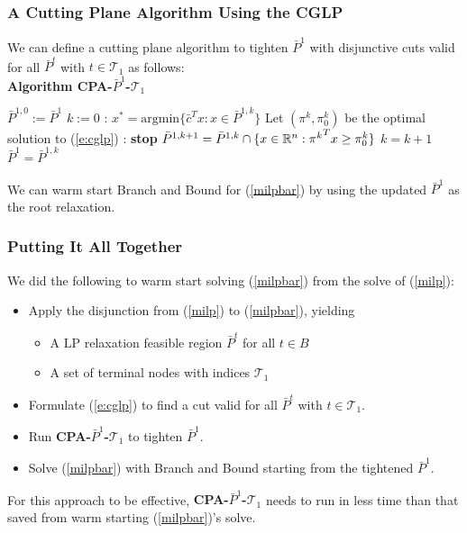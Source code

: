 \documentclass{beamer}
\begin{document}
	\begin{frame}[t]
		\frametitle{A Cutting Plane Algorithm Using the CGLP}
		\small
		\vspace{-.25cm}
		We can define a cutting plane algorithm to tighten $ \bar{P}^1 $ with disjunctive cuts valid for all $ \bar{P}^{t} $ with $ t \in \mathcal{T}_1 $ as follows: \\
		\vspace{.1cm}
		\textbf{Algorithm CPA-$ \bar{P}^1 $-$ \mathcal{T}_1 $}
		\begin{algorithmic}[1]
			\State $ \bar{P}^{1,0} := \bar{P}^1 $
			\State $ k := 0 $
			:
			\State $ x^* = \text{argmin}\{\bar{c}^T x : x \in \bar{P}^{1,k} \} $
			\State Let $ (\pi^k, \pi^k_0) $ be the optimal solution to (\ref{e:cglp})
			:
			\State \textbf{stop}
			\EndIf
			\State $ \bar{P}^{1,k+1} = \bar{P}^{1, k} \cap \{x \in \mathbb{R}^n: {\pi^k}^T x \geq \pi^k_0\} $
			\State $ k = k + 1$
			\EndWhile
			\State $ \bar{P}^1 = \bar{P}^{1,k} $
		\end{algorithmic}
		\vspace{-.1cm}
		\begin{block}{}
			We can warm start Branch and Bound for (\ref{milpbar}) by using the updated $ \bar{P}^1 $ as the root relaxation.
		\end{block}
		\normalsize
	\end{frame}

	\begin{frame}[t]
		\frametitle{Putting It All Together}
		\small
		We did the following to warm start solving (\ref{milpbar}) from the solve of (\ref{milp}):
		\begin{itemize}
			\item Apply the disjunction from (\ref{milp}) to (\ref{milpbar}), yielding
			\begin{itemize}
				\item A LP relaxation feasible region $ \bar{P}^t $ for all $ t \in B $
				\item A set of terminal nodes with indices $ \mathcal{T}_1 $
			\end{itemize}
			\item Formulate (\ref{e:cglp}) to find a cut valid for all $ \bar{P}^t $ with $ t \in \mathcal{T}_1 $.
			\item Run \textbf{CPA-$ \bar{P}^1 $-$ \mathcal{T}_1 $} to tighten $ \bar{P}^1 $.
			\item Solve (\ref{milpbar}) with Branch and Bound starting from the tightened $ \bar{P}^1 $.
		\end{itemize}
		\vspace{1.75cm}
		\begin{block}{}
			For this approach to be effective, \textbf{CPA-$ \bar{P}^1 $-$ \mathcal{T}_1 $} needs to run in less time than that saved from warm starting (\ref{milpbar})'s solve.
		\end{block}
		\normalsize
	\end{frame}
	
\end{document}
